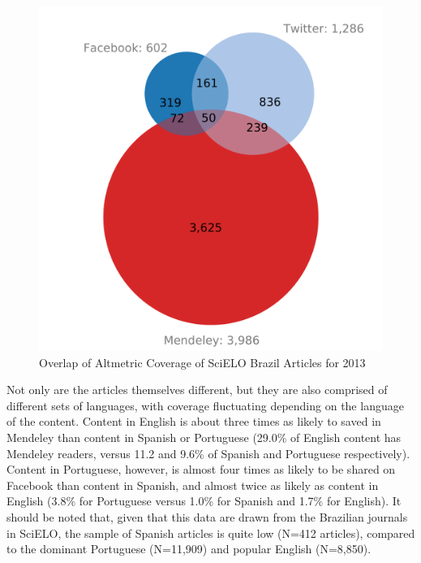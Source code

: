 \begin{figure}[htbp]
\centering
\includegraphics[keepaspectratio,width=\textwidth,height=0.45\textheight]{figures/altmetrics_venn_scielo_br.pdf}
\caption{Overlap of Altmetric Coverage of SciELO Brazil Articles for 2013}
\label{altmetrics_venn_scielo_br}
\end{figure}

Not only are the articles themselves different, but they are also comprised of different sets of languages, with coverage fluctuating depending on the language of the content. Content in English is about three times as likely to saved in Mendeley than content in Spanish or Portuguese (29.0\% of English content has Mendeley readers, versus 11.2 and 9.6\% of Spanish and Portuguese respectively). Content in Portuguese, however, is almost four times as likely to be shared on Facebook than content in Spanish, and almost twice as likely as content in English (3.8\% for Portuguese versus 1.0\% for Spanish and 1.7\% for English). It should be noted that, given that this data are drawn from the Brazilian journals in SciELO, the sample of Spanish articles is quite low (N=412 articles), compared to the dominant Portuguese (N=11,909) and popular English (N=8,850).

